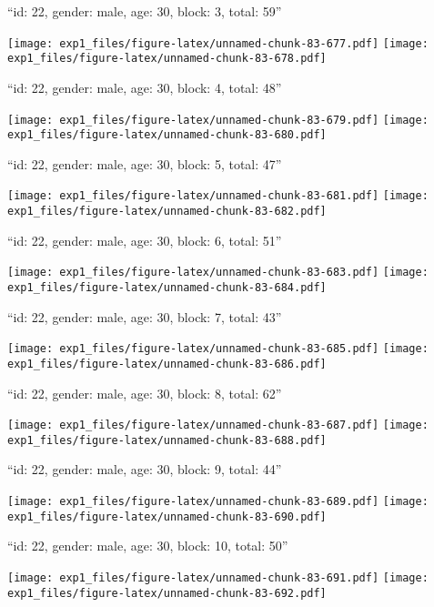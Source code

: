 \documentclass[11pt,,]{article}
\begin{document}
\newpage
[1] 

``id: 22, gender: male, age: 30, block: 3, total: 59''

\texttt{[image: exp1\_files/figure-latex/unnamed-chunk-83-677.pdf]}
\texttt{[image: exp1\_files/figure-latex/unnamed-chunk-83-678.pdf]}

\newpage
[1] 

``id: 22, gender: male, age: 30, block: 4, total: 48''

\texttt{[image: exp1\_files/figure-latex/unnamed-chunk-83-679.pdf]}
\texttt{[image: exp1\_files/figure-latex/unnamed-chunk-83-680.pdf]}

\newpage
[1] 

``id: 22, gender: male, age: 30, block: 5, total: 47''

\texttt{[image: exp1\_files/figure-latex/unnamed-chunk-83-681.pdf]}
\texttt{[image: exp1\_files/figure-latex/unnamed-chunk-83-682.pdf]}

\newpage
[1] 

``id: 22, gender: male, age: 30, block: 6, total: 51''

\texttt{[image: exp1\_files/figure-latex/unnamed-chunk-83-683.pdf]}
\texttt{[image: exp1\_files/figure-latex/unnamed-chunk-83-684.pdf]}

\newpage
[1] 

``id: 22, gender: male, age: 30, block: 7, total: 43''

\texttt{[image: exp1\_files/figure-latex/unnamed-chunk-83-685.pdf]}
\texttt{[image: exp1\_files/figure-latex/unnamed-chunk-83-686.pdf]}

\newpage
[1] 

``id: 22, gender: male, age: 30, block: 8, total: 62''

\texttt{[image: exp1\_files/figure-latex/unnamed-chunk-83-687.pdf]}
\texttt{[image: exp1\_files/figure-latex/unnamed-chunk-83-688.pdf]}

\newpage
[1] 

``id: 22, gender: male, age: 30, block: 9, total: 44''

\texttt{[image: exp1\_files/figure-latex/unnamed-chunk-83-689.pdf]}
\texttt{[image: exp1\_files/figure-latex/unnamed-chunk-83-690.pdf]}

\newpage
[1] 

``id: 22, gender: male, age: 30, block: 10, total: 50''

\texttt{[image: exp1\_files/figure-latex/unnamed-chunk-83-691.pdf]}
\texttt{[image: exp1\_files/figure-latex/unnamed-chunk-83-692.pdf]}
\end{document}
